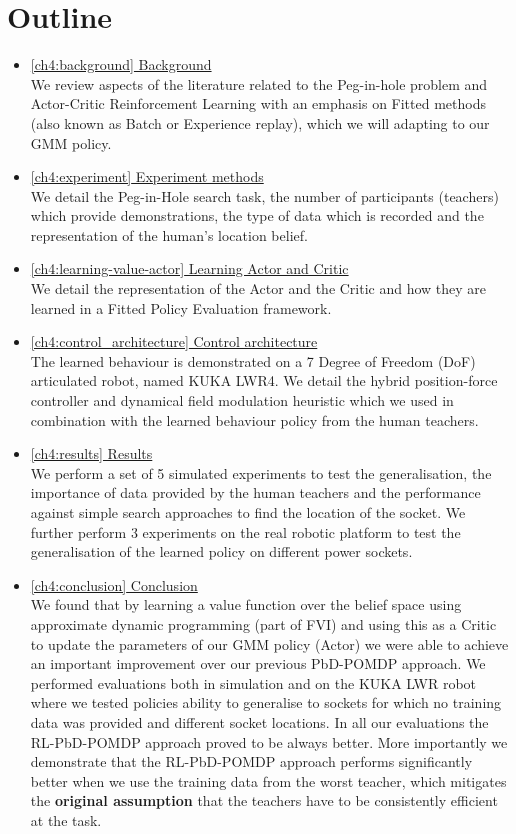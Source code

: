 \section{Outline}
\begin{itemize}
  \item \hyperref[ch4:background]{\ref{ch4:background}   Background}\\
  We review aspects of the literature related to the Peg-in-hole problem and Actor-Critic Reinforcement Learning 
  with an emphasis on Fitted methods (also known as Batch or Experience replay), which we will adapting to our GMM policy.
  \item \hyperref[ch4:experiment]{\ref{ch4:experiment}   Experiment methods}\\
  We detail the Peg-in-Hole search task, the number of participants (teachers) which provide demonstrations, the 
  type of data which is recorded and the representation of the human's location belief.
  \item \hyperref[ch4:learning-value-actor]{\ref{ch4:learning-value-actor} Learning Actor and Critic}\\
  We detail the representation of the Actor and the Critic and how they are learned in a Fitted Policy Evaluation 
  framework.
  \item \hyperref[ch4:control_architecture]{\ref{ch4:control_architecture} Control architecture}\\
  The learned behaviour is demonstrated on a 7 Degree of Freedom (DoF) articulated robot, named KUKA LWR4. 
  We detail the hybrid position-force controller and dynamical field modulation heuristic which we used in 
  combination with the learned behaviour policy from the human teachers.
  \item \hyperref[ch4:results]{\ref{ch4:results}  	 Results}\\
  We perform a set of 5 simulated experiments to test the generalisation, the importance of data provided by the human 
  teachers and the performance against simple search approaches to find the location of the socket. We further perform 
  3 experiments on the real robotic platform to test the generalisation of the learned policy on different power sockets.
  \item \hyperref[ch4:conclusion]{\ref{ch4:conclusion} Conclusion}\\
  We found that by learning a value function over the belief space using approximate dynamic programming (part of FVI) and using 
this as a Critic to update the parameters of our GMM policy (Actor) we were able to achieve an important improvement over our 
previous PbD-POMDP approach. We  performed evaluations both in simulation and on the KUKA LWR robot where we tested 
policies ability to generalise to sockets for which no training data was provided and different socket locations. 
In all our evaluations the RL-PbD-POMDP approach proved to be always better. More importantly we demonstrate that 
the RL-PbD-POMDP approach performs significantly better when we use the training data from the worst teacher, 
which mitigates the \textbf{original assumption} that the teachers have to be consistently efficient at the task.
\end{itemize}

